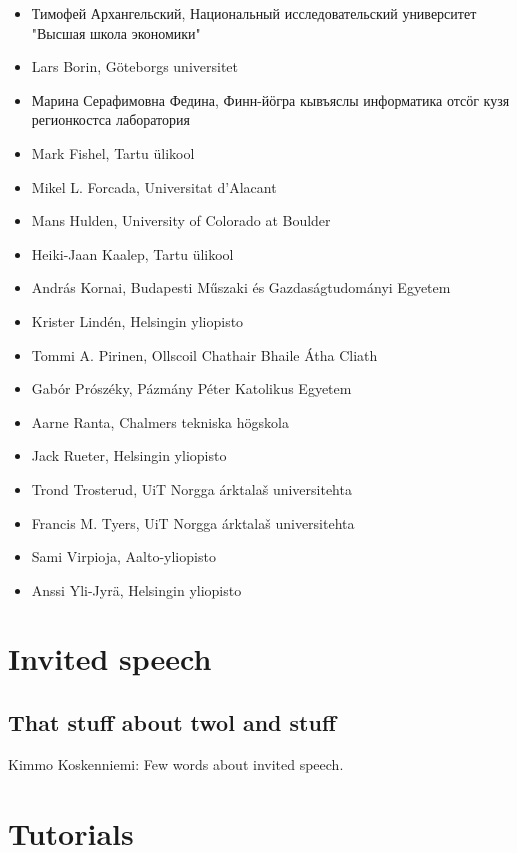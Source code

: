 \documentclass[b5paper]{book}
\begin{document}
\begin{itemize}
    \item Тимофей Архангельский, Национальный исследовательский университет "Высшая школа экономики"
    \item Lars Borin, Göteborgs universitet
    \item Марина Серафимовна Федина, Финн-йӧгра кывъяслы информатика отсӧг кузя регионкостса лаборатория
    \item Mark Fishel, Tartu ülikool
    \item Mikel L. Forcada, Universitat d'Alacant
    \item Mans Hulden, University of Colorado at Boulder
    \item Heiki-Jaan Kaalep, Tartu ülikool
    \item András Kornai, Budapesti Műszaki és Gazdaságtudományi Egyetem
    \item Krister Lindén, Helsingin yliopisto
    \item Tommi A. Pirinen, Ollscoil Chathair Bhaile Átha Cliath
    \item Gabór Prószéky, Pázmány Péter Katolikus Egyetem
    \item Aarne Ranta, Chalmers tekniska högskola
    \item Jack Rueter, Helsingin yliopisto
    \item Trond Trosterud, UiT Norgga árktalaš universitehta
    \item Francis M. Tyers, UiT Norgga árktalaš universitehta
    \item Sami Virpioja, Aalto-yliopisto
    \item Anssi Yli-Jyrä, Helsingin yliopisto
\end{itemize}

\tableofcontents

\mainmatter

\chapter{Invited speech}
\section{That stuff about twol and stuff}

Kimmo Koskenniemi: Few words about invited speech.


\chapter{Tutorials}
\end{document}
